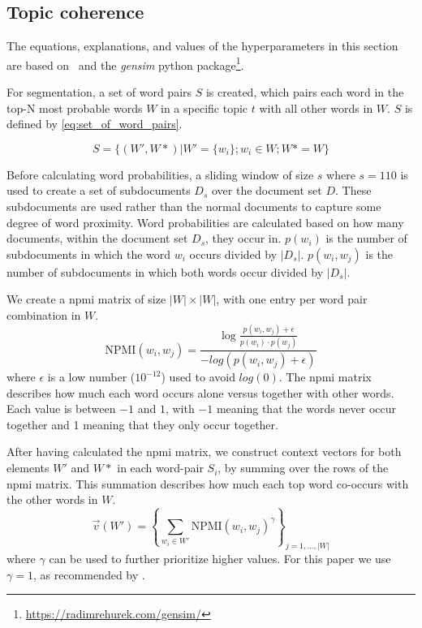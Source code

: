 \subsection{Topic coherence}\label{app:topic_coherence}
The equations, explanations, and values of the hyperparameters in this section are based on~\citet{Syed2017coherence} and the \textit{gensim} python package\footnote{\url{https://radimrehurek.com/gensim/}}.

For segmentation, a set of word pairs $S$ is created, which pairs each word in the top-N most probable words $W$ in a specific topic $t$ with all other words in $W$.
$S$ is defined by \autoref{eq:set_of_word_pairs}.

\begin{equation}\label{eq:set_of_word_pairs}
	S = \{(W', W*)|W' = \{w_i\};w_i \in W;W* = W\}
\end{equation}

Before calculating word probabilities, a sliding window of size $s$ where $s =110$ is used to create a set of subdocuments $D_s$ over the document set $D$.
These subdocuments are used rather than the normal documents to capture some degree of word proximity.
Word probabilities are calculated based on how many documents, within the document set $D_s$, they occur in.
$p(w_i)$ is the number of subdocuments in which the word $w_i$ occurs divided by $|D_s|$.
$p(w_i, w_j)$ is the number of subdocuments in which both words occur divided by $|D_s|$. 

We create a \gls{npmi} matrix of size $|W|\times|W|$, with one entry per word pair combination in $W$.
\begin{equation}\label{eq:coherence_2}
	\text{NPMI}(w_i,w_j) =  \frac{\log\frac{p(w_i,w_j) + \epsilon}{p(w_i)\cdot p(w_j)}}{-log(p(w_i,w_j) + \epsilon)}
\end{equation}
\noindent where $\epsilon$ is a low number ($10^{-12}$) used to avoid $log(0)$.
The \gls{npmi} matrix describes how much each word occurs alone versus together with other words.
Each value is between $-1$ and $1$, with $-1$ meaning that the words never occur together and 1 meaning that they only occur together.

After having calculated the \gls{npmi} matrix, we construct context vectors for both elements $W'$ and $W*$ in each word-pair $S_i$, by summing over the rows of the \gls{npmi} matrix.
This summation describes how much each top word co-occurs with the other words in $W$.
\begin{equation}\label{eq:coherence_1}
	\overrightarrow{v}(W') = \left\{ \sum_{w_i \in W'} \text{NPMI}(w_i, w_j)^{\gamma} \right\}_{j=1,\dots,|W|}
\end{equation}
\noindent where $\gamma$ can be used to further prioritize higher values.
For this paper we use $\gamma = 1$, as recommended by \citet{Syed2017coherence}.


